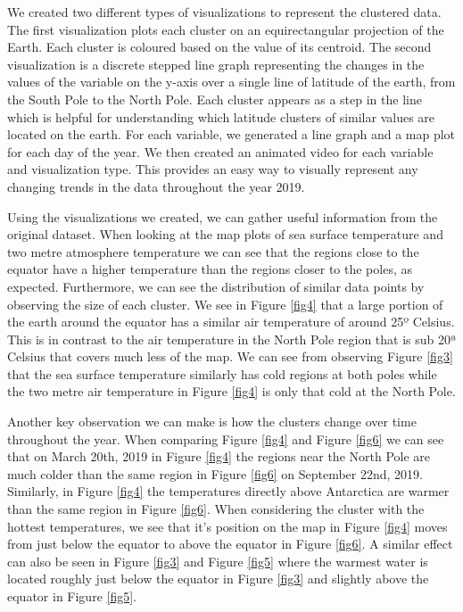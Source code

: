 \documentclass[conference,compsoc]{IEEEtran}
\begin{document}
We created two different types of visualizations to represent the clustered data. The first visualization plots each cluster on an equirectangular projection of the Earth. Each cluster is coloured based on the value of its centroid. The second visualization is a discrete stepped line graph representing the changes in the values of the variable on the y-axis over a single line of latitude of the earth, from the South Pole to the North Pole. Each cluster appears as a step in the line which is helpful for understanding which latitude clusters of similar values are located on the earth. For each variable, we generated a line graph and a map plot for each day of the year. We then created an animated video for each variable and visualization type. This provides an easy way to visually represent any changing trends in the data throughout the year 2019.

Using the visualizations we created, we can gather useful information from the original dataset. When looking at the map plots of sea surface temperature and two metre atmosphere temperature we can see that the regions close to the equator have a higher temperature than the regions closer to the poles, as expected. Furthermore, we can see the distribution of similar data points by observing the size of each cluster. We see in Figure \ref{fig4} that a large portion of the earth around the equator has a similar air temperature of around 25º Celsius. This is in contrast to the air temperature in the North Pole region that is sub 20ª Celsius that covers much less of the map. We can see from observing Figure \ref{fig3} that the sea surface temperature similarly has cold regions at both poles while the two metre air temperature in Figure \ref{fig4} is only that cold at the North Pole.

Another key observation we can make is how the clusters change over time throughout the year. When comparing Figure \ref{fig4} and Figure \ref{fig6} we can see that on March 20th, 2019 in Figure \ref{fig4} the regions near the North Pole are much colder than the same region in Figure \ref{fig6} on September 22nd, 2019. Similarly, in Figure \ref{fig4} the temperatures directly above Antarctica are warmer than the same region in Figure \ref{fig6}. When considering the cluster with the hottest temperatures, we see that it’s position on the map in Figure \ref{fig4} moves from just below the equator to above the equator in Figure \ref{fig6}. A similar effect can also be seen in Figure \ref{fig3} and Figure \ref{fig5} where the warmest water is located roughly just below the equator in Figure \ref{fig3} and slightly above the equator in Figure \ref{fig5}.
\end{document}
